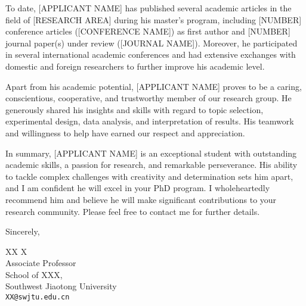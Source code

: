 \documentclass[11pt]{article}
\begin{document}
\bigskip

To date, [APPLICANT NAME] has published several academic articles in the field of [RESEARCH AREA] during his master's program, including [NUMBER] conference articles ([CONFERENCE NAME]) as first author and [NUMBER] journal paper(s) under review ([JOURNAL NAME]). Moreover, he participated in several international academic conferences and had extensive exchanges with domestic and foreign researchers to further improve his academic level.

\bigskip

Apart from his academic potential, [APPLICANT NAME] proves to be a caring, conscientious, cooperative, and trustworthy member of our research group. He generously shared his insights and skills with regard to topic selection, experimental design, data analysis, and interpretation of results. His teamwork and willingness to help have earned our respect and appreciation.

\bigskip

In summary, [APPLICANT NAME] is an exceptional student with outstanding academic skills, a passion for research, and remarkable perseverance. His ability to tackle complex challenges with creativity and determination sets him apart, and I am confident he will excel in your PhD program. I wholeheartedly recommend him and believe he will make significant contributions to your research community. Please feel free to contact me for further details.

\bigskip

Sincerely,

\vspace{2em}

XX X \\
Associate Professor \\
School of XXX, \\
Southwest Jiaotong University \\
\texttt{XX@swjtu.edu.cn}
\end{document}

